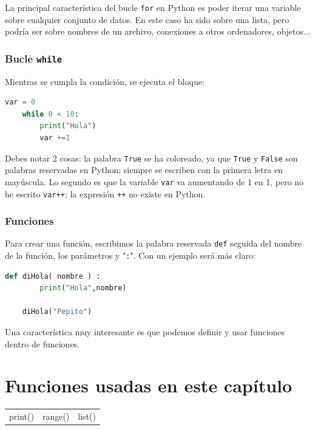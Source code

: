 \documentclass[openany,a4paper]{book}
\begin{document}
La principal característica del bucle \texttt{for} en Python es poder iterar una variable sobre cualquier conjunto de datos. En este caso ha sido sobre una lista, pero podría ser sobre nombres de un archivo, conexiones a otros ordenadores, objetos...

\subsubsection{Bucle \texttt{while}}

Mientras se cumpla la condición, se ejecuta el bloque:
\begin{lstlisting}[language=Python]
    var = 0
    while 0 < 10:
        print("Hola")
        var +=1
\end{lstlisting}

Debes notar 2 cosas: la palabra \texttt{True} se ha coloreado, ya que \texttt{True} y \texttt{False} son palabras reservadas en Python; siempre se escriben con la primera letra en mayúscula. Lo segundo es que la variable \texttt{var} va aumentando de 1 en 1, pero no he escrito \texttt{var++}; la expresión \texttt{++} no existe en Python.

\subsubsection{Funciones}

Para crear una función, escribimos la palabra reservada \texttt{def} seguida del nombre de la función, los parámetros y "\texttt{:}". Con un ejemplo será más claro:

\begin{lstlisting}[language=Python]
    def diHola( nombre ) :
        print("Hola",nombre)
    
    diHola("Pepito")
\end{lstlisting}

Una característica muy interesante es que podemos definir y usar funciones dentro de funciones.

\section*{Funciones usadas en este capítulo}

\begin{table}[H]
\centering
\begin{tabular}{lll}
print() & range() & list()
\end{tabular}
\end{table}
\end{document}
